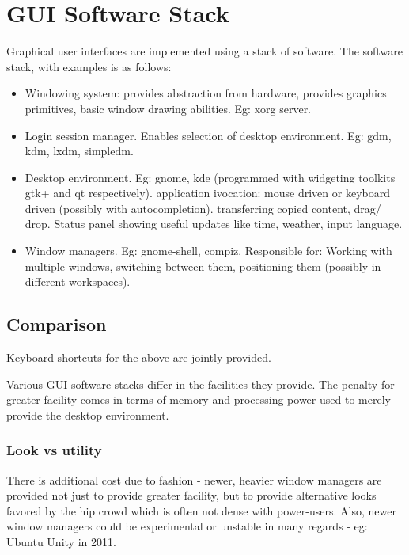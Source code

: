 \documentclass[oneside, article]{memoir}
\begin{document}
\section{GUI Software Stack}
Graphical user interfaces are implemented using a stack of software. The software stack, with examples is as follows: 

\begin{itemize}
\item Windowing system: provides abstraction from hardware, provides graphics primitives, basic window drawing abilities. Eg: xorg server.
\item Login session manager. Enables selection of desktop environment. Eg: gdm, kdm, lxdm, simpledm.

\item Desktop environment. Eg: gnome, kde (programmed with widgeting toolkits gtk+ and qt respectively).
\subitem application ivocation: mouse driven or keyboard driven (possibly with autocompletion).
\subitem transferring copied content, drag/ drop.
\subitem Status panel showing useful updates like time, weather, input language.

\item Window managers. Eg: gnome-shell, compiz.
\subitem Responsible for: Working with multiple windows, switching between them, positioning them (possibly in different workspaces).

\end{itemize}

\subsection{Comparison}
Keyboard shortcuts for the above are jointly provided.

Various GUI software stacks differ in the facilities they provide. The penalty for greater facility comes in terms of memory and processing power used to merely provide the desktop environment.

\subsubsection{Look vs utility}
There is additional cost due to fashion - newer, heavier window managers are provided not just to provide greater facility, but to provide alternative looks favored by the hip crowd which is often not dense with power-users. Also, newer window managers could be experimental or unstable in many regards - eg: Ubuntu Unity  in 2011.
\end{document}
